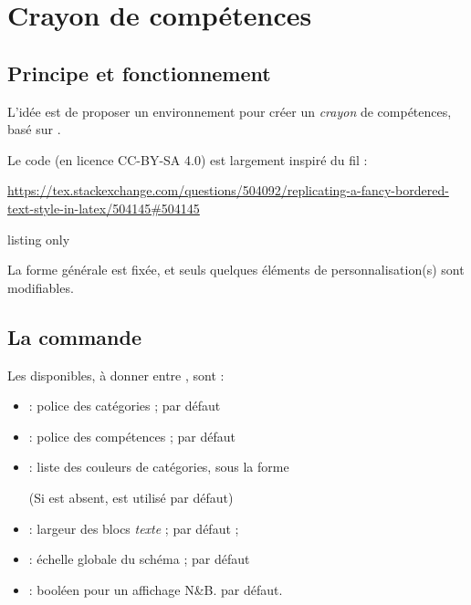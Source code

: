 \documentclass[french,11pt,a4paper]{article}
\begin{document}
\pagebreak

\section{Crayon de compétences}

\subsection{Principe et fonctionnement}

L'idée est de proposer un environnement pour créer un \textit{crayon} de compétences, basé sur .

Le code (en licence CC-BY-SA 4.0) est largement inspiré du fil :

\hfill{\footnotesize \url{https://tex.stackexchange.com/questions/504092/replicating-a-fancy-bordered-text-style-in-latex/504145#504145}}\hfill~

\begin{DemoCode}{listing only}
\end{DemoCode}

\begin{DemoCode}{}
\end{DemoCode}

La forme générale est fixée, et seuls quelques éléments de personnalisation(s) sont modifiables.

\subsection{La commande}

Les  disponibles, à donner entre \MontreCode{[...]}, sont :

\begin{itemize}
	\item {} : police des catégories ;  par défaut
	\item {} : police des compétences ;  par défaut
	\item {} : liste des couleurs de catégories, sous la forme
	
	
	(Si  est absent,  est utilisé par défaut)
	\item {} : largeur des blocs \textit{texte} ; \MontreCode{5cm} par défaut ;
	\item {} : échelle globale du schéma ;  par défaut
	\item {} : booléen pour un affichage N\&B.  par défaut.
\end{itemize}
\end{document}
